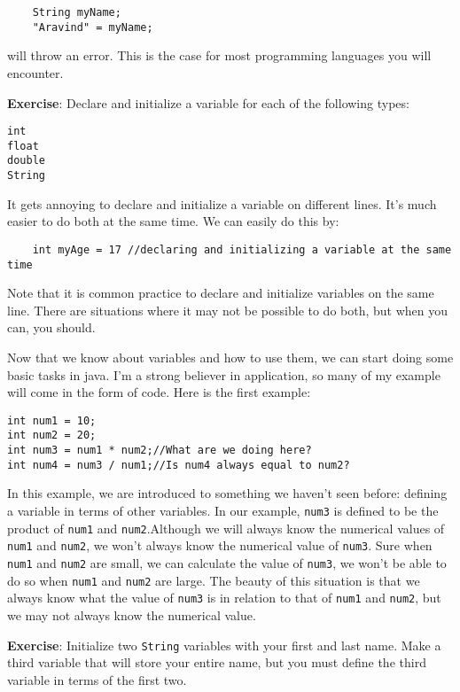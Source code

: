 \documentclass[11pt,fleqn]{article}
\begin{document}
\begin{verbatim}
    String myName;
    "Aravind" = myName;
\end{verbatim}

will throw an error. This is the case for most programming languages you will
encounter.

\textbf{Exercise}: Declare and initialize a variable for each of the following
types: 

\begin{verbatim}
int
float
double
String
\end{verbatim}

It gets annoying to declare and initialize a variable on different lines. It's
much easier to do both at the same time. We can easily do this by:

\begin{verbatim}
    int myAge = 17 //declaring and initializing a variable at the same time
\end{verbatim}

Note that it is common practice to declare and initialize variables on the same
line. There are situations where it may not be possible to do both, but when you
can, you should.

Now that we know about variables and how to use them, we can start doing some
basic tasks in java. I'm a strong believer in application, so many of my example
will come in the form of code. Here is the first example:

\begin{verbatim}
int num1 = 10;
int num2 = 20;
int num3 = num1 * num2;//What are we doing here?
int num4 = num3 / num1;//Is num4 always equal to num2?
\end{verbatim}

In this example, we are introduced to something we haven't seen before: defining
a variable in terms of other variables. In our example, \texttt{num3} is defined
to be the product of \texttt{num1} and \texttt{num2}.Although we will always
know the numerical values of \texttt{num1} and \texttt{num2}, we won't always
know the numerical value of \texttt{num3}. Sure when \texttt{num1} and
\texttt{num2} are small, we can calculate the value of \texttt{num3}, we won't
be able to do so when \texttt{num1} and \texttt{num2} are large. The beauty of
this situation is that we always know what the value of \texttt{num3} is in
relation to that of \texttt{num1} and \texttt{num2}, but we may not always know
the numerical value. 

\textbf{Exercise}: Initialize two \texttt{String} variables with your first and
last name. Make a third variable that will store your entire name, but you must
define the third variable in terms of the first two. 
\end{document}
